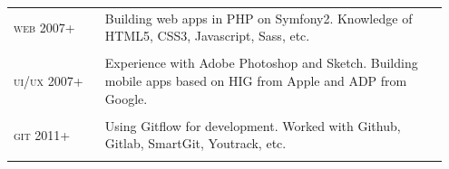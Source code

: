 \documentclass[10pt]{article} %
\begin{document}
\begin{minipage}[t]{0.5\textwidth}
\begin{tabular}{@{}p{0.2\linewidth}p{0.75\linewidth}@{}}
\large\textsc{web} \newline \small\textsc{2007+} & 
Building web apps in PHP on Symfony2. Knowledge of HTML5, CSS3, Javascript, Sass, etc.  \\
&\\

\large\textsc{ui/ux} \newline \small\textsc{2007+} & 
Experience with Adobe Photoshop and Sketch. Building mobile apps based on HIG from Apple and
ADP from Google. \\
&\\

\large\textsc{git} \newline \small\textsc{2011+} & 
Using Gitflow for development. Worked with Github, Gitlab, SmartGit, Youtrack, etc.  \\
&\\

\end{tabular}\\[10pt]


\end{minipage} %
\hfill
\end{document}
